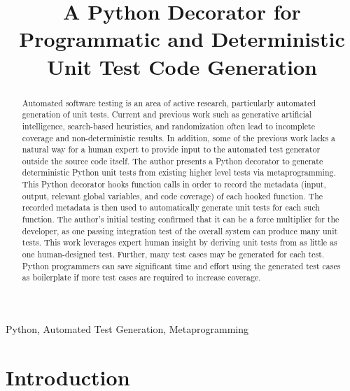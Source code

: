 \documentclass[10pt, conference]{IEEEtran}
\begin{document}
\title{A Python Decorator for Programmatic and Deterministic Unit Test Code Generation\\}

\author{
}
\maketitle

\begin{abstract}
Automated software testing is an area of active research, 
    particularly automated generation of unit tests. 
Current and previous work such as generative artificial intelligence, search-based heuristics, and 
    randomization often lead to incomplete coverage and non-deterministic results.
In addition, some of the previous work lacks a natural way for a human expert 
    to provide input to the automated test generator outside the source code itself. 
The author presents a Python decorator to generate deterministic Python 
    unit tests from existing higher level tests via metaprogramming.  
This Python decorator hooks function calls in order to record the 
    metadata (input, output, relevant global variables, and code coverage) 
    of each hooked function. 
The recorded metadata is then used to automatically generate unit 
    tests for each such function.
The author's initial testing confirmed that it can 
    be a force multiplier for the developer, 
    as one passing integration test of the overall 
    system can produce many unit tests.  
This work leverages expert human insight by deriving unit tests
    from as little as one human-designed test.
Further, many test cases may be generated for each test.  
    Python programmers can save significant time and effort using the 
    generated test cases as boilerplate if more test cases are required to 
    increase coverage.  


  \end{abstract} 
\begin{IEEEkeywords}
Python, Automated Test Generation, Metaprogramming
\end{IEEEkeywords}

\section{Introduction}\label{sec:introduction}
\end{document}
